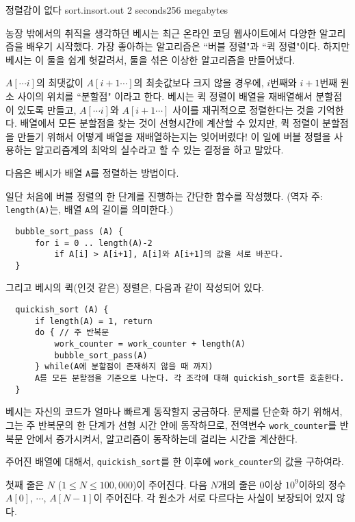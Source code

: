 \begin{problem}{정렬감이 없다}
	{sort.in}{sort.out}
	{2 seconds}{256 megabytes}{}
	
	농장 밖에서의 취직을 생각하던 베시는 최근 온라인 코딩 웹사이트에서 다양한 알고리즘을 배우기 시작했다. 가장 좋아하는 알고리즘은 ``버블 정렬"과 ``퀵 정렬"이다. 하지만 베시는 이 둘을 쉽게 헛갈려서, 둘을 섞은 이상한 알고리즘을 만들어냈다.
	
	$A[\cdots i]$의 최댓값이 $A[i+1 \cdots]$의 최솟값보다 크지 않을 경우에, $i$번째와 $i+1$번째 원소 사이의 위치를 ``분할점" 이라고 한다. 베시는 퀵 정렬이 배열을 재배열해서 분할점이 있도록 만들고, $A[\cdots i]$와 $A[i+1 \cdots]$ 사이를 재귀적으로 정렬한다는 것을 기억한다. 배열에서 모든 분할점을 찾는 것이 선형시간에 계산할 수 있지만, 퀵 정렬이 분할점을 만들기 위해서 어떻게 배열을 재배열하는지는 잊어버렸다! 이 일에 버블 정렬을 사용하는 알고리즘계의 최악의 실수라고 할 수 있는 결정을 하고 말았다.
	
	다음은 베시가 배열 \texttt{A}를 정렬하는 방법이다. 
	
	일단 처음에 버블 정렬의 한 단계를 진행하는 간단한 함수를 작성했다. (역자 주: \texttt{length(A)}는, 배열 \texttt{A}의 길이를 의미한다.) 
	
\begin{verbatim}
  bubble_sort_pass (A) {
      for i = 0 .. length(A)-2
          if A[i] > A[i+1], A[i]와 A[i+1]의 값을 서로 바꾼다.
  }
\end{verbatim}

	그리고 베시의 퀵(인것 같은) 정렬은, 다음과 같이 작성되어 있다.
\begin{verbatim}
  quickish_sort (A) {
      if length(A) = 1, return
      do { // 주 반복문
          work_counter = work_counter + length(A)
          bubble_sort_pass(A)
      } while(A에 분할점이 존재하지 않을 때 까지)
      A를 모든 분할점을 기준으로 나눈다. 각 조각에 대해 quickish_sort를 호출한다.
  }
\end{verbatim}

	베시는 자신의 코드가 얼마나 빠르게 동작할지 궁금하다. 문제를 단순화 하기 위해서, 그는 주 반복문의 한 단계가 선형 시간 안에 동작하므로, 전역변수 \texttt{work\_counter}를 반복문 안에서 증가시켜서, 알고리즘이 동작하는데 걸리는 시간을 계산한다.
	
	주어진 배열에 대해서, \texttt{quickish\_sort}를 한 이후에 \texttt{work\_counter}의 값을 구하여라.
	
	\InputFile
	
	첫째 줄은 $N$ ($1 \le N \le 100,000$)이 주어진다. 다음 $N$개의 줄은 $0$이상 $10^9$이하의 정수 $A[0]$, $\cdots$, $A[N-1]$이 주어진다. 각 원소가 서로 다르다는 사실이 보장되어 있지 않다.
	

\end{problem}
